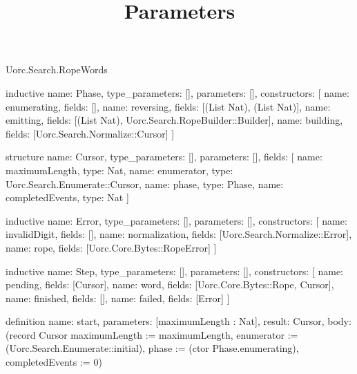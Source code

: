 \begin{lexlean}{Uorc.Search.RopeWords}
\title{Parameters}
\begin{semanticmodule}
inductive{
  name: Phase,
  type_parameters: [],
  parameters: [],
  constructors: [
    {name: enumerating, fields: []},
    {name: reversing, fields: [(List Nat), (List Nat)]},
    {name: emitting, fields: [(List Nat), Uorc.Search.RopeBuilder::Builder]},
    {name: building, fields: [Uorc.Search.Normalize::Cursor]}
  ]
}

structure{
  name: Cursor,
  type_parameters: [],
  parameters: [],
  fields: [
    {name: maximumLength, type: Nat},
    {name: enumerator, type: Uorc.Search.Enumerate::Cursor},
    {name: phase, type: Phase},
    {name: completedEvents, type: Nat}
  ]
}

inductive{
  name: Error,
  type_parameters: [],
  parameters: [],
  constructors: [
    {name: invalidDigit, fields: []},
    {name: normalization, fields: [Uorc.Search.Normalize::Error]},
    {name: rope, fields: [Uorc.Core.Bytes::RopeError]}
  ]
}

inductive{
  name: Step,
  type_parameters: [],
  parameters: [],
  constructors: [
    {name: pending, fields: [Cursor]},
    {name: word, fields: [Uorc.Core.Bytes::Rope, Cursor]},
    {name: finished, fields: []},
    {name: failed, fields: [Error]}
  ]
}

definition{
  name: start,
  parameters: [maximumLength : Nat],
  result: Cursor,
  body: (record Cursor {maximumLength := maximumLength, enumerator := (Uorc.Search.Enumerate::initial), phase := (ctor Phase.enumerating), completedEvents := 0})
}


\end{semanticmodule}
\end{lexlean}
